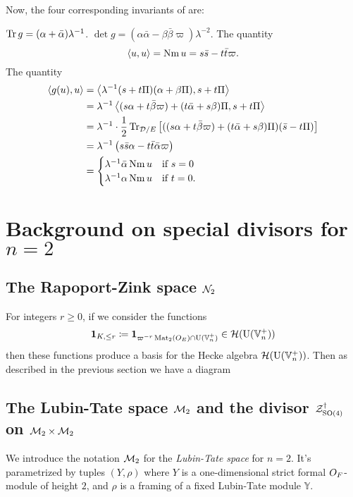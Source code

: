 Now, the four corresponding invariants of  are:
\begin{itemize}
  \ii $\operatorname{Tr} g = (\alpha + \bar\alpha) \lambda^{-1}$.
  \ii $\det g = (\alpha \bar \alpha - \beta \bar\beta \varpi)\lambda^{-2}$.
  \ii The quantity
  \[ \left\langle u,u \right\rangle = \operatorname{Nm} u = s \bar s - t \bar t \varpi. \]
  \ii The quantity
  \begin{align*}
    \left\langle g(u), u \right\rangle
    &= \left\langle \lambda^{-1}(s + t \Pi)(\alpha + \beta \Pi), s + t \Pi \right\rangle \\
    &= \lambda^{-1} \left\langle
      (s \alpha + t \bar \beta \varpi) + (t \bar \alpha + s \beta) \Pi,
      s + t \Pi \right\rangle \\
    &= \lambda^{-1} \cdot \frac{1}{2} \operatorname{Tr}_{\mathcal D/E} \left[
      ((s \alpha + t \bar \beta \varpi) + (t \bar \alpha + s \beta) \Pi)
      (\bar s - t \Pi) \right] \\
    &= \lambda^{-1} \left( s \bar s \alpha - t \bar t \bar \alpha \varpi \right) \\
    &= \begin{cases}
      \lambda^{-1} \bar\alpha \operatorname{Nm} u & \text{if } s = 0 \\
      \lambda^{-1} \alpha \operatorname{Nm} u & \text{if } t = 0.
    \end{cases}
  \end{align*}
\end{itemize}

\section{Background on special divisors for $n = 2$}
\subsection{The Rapoport-Zink space $\mathcal N_2$}
For integers $r \ge 0$, if we consider the functions
\[ \mathbf{1}_{K, \le r} \coloneqq \mathbf{1}_{\varpi^{-r} \operatorname{Mat}_2(O_E) \cap \operatorname{U}(\mathbb V_n^+)} \in \mathcal H(\operatorname{U}(\mathbb V_n^+)) \]
then these functions produce a basis for the Hecke algebra $\mathcal H(\operatorname{U}(\mathbb V_n^+))$.
Then as described in the previous section we have a diagram
\begin{center}
\end{center}

\subsection{The Lubin-Tate space $\mathcal M_2$ and the divisor $\mathcal Z^{\dagger}_{\operatorname{SO}(4)}$ on $\mathcal M_2 \times \mathcal M_2$}
We introduce the notation $\mathcal M_2$ for the \emph{Lubin-Tate space} for $n = 2$.
It's parametrized by tuples $(Y, \rho)$
where $Y$ is a one-dimensional strict formal $O_F$-module of height $2$,
and $\rho$ is a framing of a fixed Lubin-Tate module $\mathbb{Y}$.

